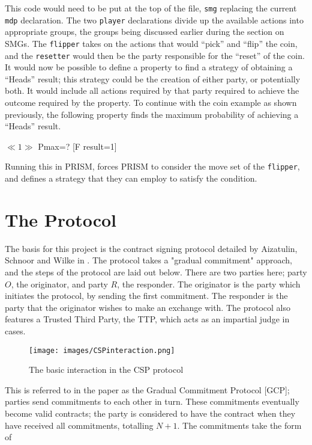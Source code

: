 \documentclass{l4proj}
\begin{document}
This code would need to be put at the top of the file, {\tt smg} replacing the current {\tt mdp} declaration. The two {\tt player} declarations divide up the available actions into appropriate groups, the groups being discussed earlier during the section on SMGs. The {\tt flipper} takes on the actions  that would ``pick'' and ``flip'' the coin, and the {\tt resetter} would then be the party responsible for the ``reset'' of the coin. It would now be possible to define a property to find a strategy of obtaining a ``Heads'' result; this strategy could be the creation of either party, or potentially both. It would include all actions required by that party required to achieve the outcome required by the property. To continue with the coin example as shown previously, the following property finds the maximum probability of achieving a ``Heads'' result.

\centerline{$\ll1\gg$ Pmax=? [F result=1]}

Running this in PRISM, forces PRISM to consider the move set of the {\tt flipper}, and defines a strategy that they can employ to satisfy the condition.



\chapter{The Protocol}
The basis for this project is the contract signing protocol detailed by Aizatulin, Schnoor and Wilke in \cite{ASW09}. The protocol takes a "gradual commitment" approach, and the steps of the protocol are laid out below. There are two parties here; party $O$, the originator, and party $R$, the responder. The originator is the party which initiates the protocol, by sending the first commitment. The responder is the party that the originator wishes to make an exchange with. The protocol also features a Trusted Third Party, the TTP, which acts as an impartial judge in cases.


\begin{figure}[ht!]
\centering
\texttt{[image: images/CSPinteraction.png]}
\caption{The basic interaction in the CSP protocol}
\label{csp}
\end{figure}

This is referred to in the paper as the Gradual Commitment Protocol [GCP]; parties send commitments to each other in turn. These commitments eventually become valid contracts; the party is considered to have the contract when they have received all commitments, totalling $N+1$. The commitments take the form of\\
\end{document}
